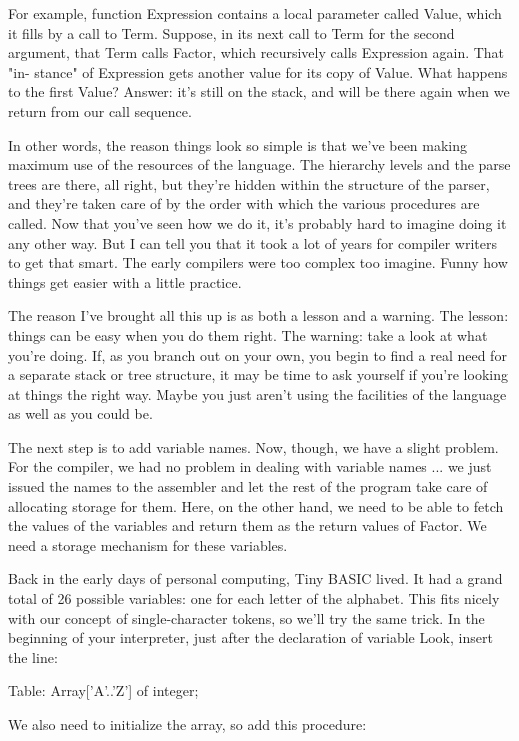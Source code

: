 \documentclass[float=false, crop=false]{standalone}
\begin{document}
For example, function Expression contains a local parameter called Value, which
it fills by a call to Term. Suppose, in its next call to Term for the second
argument, that Term calls Factor, which recursively calls Expression again. That
"in- stance" of Expression gets another value for its copy of Value. What
happens to the first Value? Answer: it's still on the stack, and will be there
again when we return from our call sequence.

In other words, the reason things look so simple is that we've been making
maximum use of the resources of the language. The hierarchy levels and the parse
trees are there, all right, but they're hidden within the structure of the
parser, and they're taken care of by the order with which the various procedures
are called. Now that you've seen how we do it, it's probably hard to imagine
doing it any other way. But I can tell you that it took a lot of years for
compiler writers to get that smart. The early compilers were too complex too
imagine. Funny how things get easier with a little practice.

The reason I've brought all this up is as both a lesson and a warning. The
lesson: things can be easy when you do them right. The warning: take a look at
what you're doing. If, as you branch out on your own, you begin to find a real
need for a separate stack or tree structure, it may be time to ask yourself if
you're looking at things the right way. Maybe you just aren't using the
facilities of the language as well as you could be.


The next step is to add variable names. Now, though, we have a slight problem.
For the compiler, we had no problem in dealing with variable names ... we just
issued the names to the assembler and let the rest of the program take care of
allocating storage for them. Here, on the other hand, we need to be able to
fetch the values of the variables and return them as the return values of
Factor. We need a storage mechanism for these variables.

Back in the early days of personal computing,  Tiny  BASIC lived.
It had  a  grand  total  of  26  possible variables: one for each
letter of the  alphabet.    This  fits nicely with our concept of
single-character tokens, so we'll  try  the  same  trick.  In the
beginning of your  interpreter,  just  after  the  declaration of
variable Look, insert the line:

               Table: Array['A'..'Z'] of integer;

We also need to initialize the array, so add this procedure:
\end{document}

